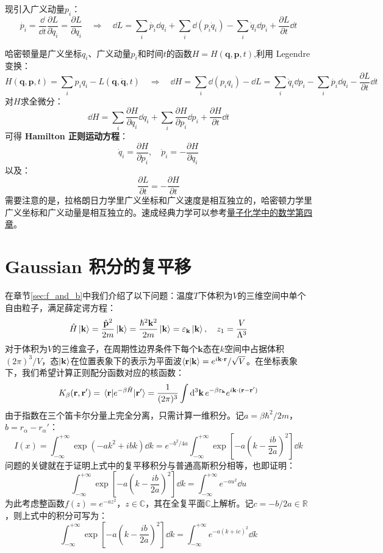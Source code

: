 现引入广义动量$p_i$：
\[\dot{p_i}=\frac{\dd}{\dd t}\frac{\partial L}{\partial \dot{q}_i}=\frac{\partial L}{\partial q_i} \quad \Rightarrow \quad \dd{L}=\sum_i\dot{p_i}\dd{q_i}+\sum_i\dd\left(p_i\dot{q}_i\right)-\sum_i\dot{q}_i\dd{p_i}+\frac{\partial L}{\partial t}\dd{t}\]

哈密顿量是广义坐标$q_i$、广义动量$p_i$和时间$t$的函数$H=H(\mathbf{q},\mathbf{p},t)$,利用 Legendre 变换：
\[H(\mathbf{q},\mathbf{p},t)=\sum_ip_iq_i-L(\mathbf{q},\dot{\mathbf{q}},t) \quad \Rightarrow \quad \dd{H}=\sum_i\dd\left(p_iq_i\right)-\dd{L}=\sum_i\dot{q}_i\dd{p_i}-\sum_i\dot{p_i}\dd{q_i}-\frac{\partial L}{\partial t}\dd{t}\]
对$H$求全微分：
\[\dd{H}=\sum_i\frac{\partial H}{\partial q_i}\dd{q_i}+\sum_i\frac{\partial H}{\partial p_i}\dd{p_i}+\frac{\partial H}{\partial t}\dd{t}\]
可得\textbf{ Hamilton 正则运动方程}：
\[\dot{q}_i=\frac{\partial H}{\partial p_i}, \quad \dot{p}_i=-\frac{\partial H}{\partial q_i}\]
以及：
\[\frac{\partial L}{\partial t}=-\frac{\partial H}{\partial t}\]
需要注意的是，拉格朗日力学里广义坐标和广义速度是相互独立的，哈密顿力学里广义坐标和广义动量是相互独立的。速成经典力学可以参考\href{https://github.com/Astolfo-Official/Baby-Math-on-Quantum-Chemistry/blob/main/%E3%80%8A%E9%87%8F%E5%AD%90%E5%8C%96%E5%AD%A6%E4%B8%AD%E7%9A%84%E6%95%B0%E5%AD%A6%E3%80%8B2.0.pdf}{量子化学中的数学第四章}。

\section{Gaussian 积分的复平移}\label{sec:gaussian}
在章节\ref{sec:f_and_b}中我们介绍了以下问题：温度$T$下体积为$V$的三维空间中单个自由粒子，满足薛定谔方程：
\[\hat{H}\ket{\mathbf{k}}=\frac{\hat{\mathbf{p}}^2}{2m}\ket{\mathbf{k}}=\frac{\hbar^2\mathbf{k}^2}{2m}\ket{\mathbf{k}}=\varepsilon_{\mathbf{k}}\ket{\mathbf{k}}, \quad z_1=\frac{V}{\Lambda^3}\]
对于体积为$V$的三维盒子，在周期性边界条件下每个$\mathbf{k}$态在$k$空间中占据体积$(2\pi)^3/V$，态$\ket{\mathbf{k}}$在位置表象下的表示为平面波$\bra{\mathbf{r}}\ket{\mathbf{k}}=e^{i\mathbf{k}\cdot\mathbf{r}}/\sqrt{V}$。在坐标表象下，我们希望计算正则配分函数对应的核函数：
\[K_{\beta}(\mathbf{r},\mathbf{r}')=\matrixel{\mathbf{r}}{e^{-\beta\hat{H}}}{\mathbf{r}'}=\frac{1}{(2\pi)^3}\int\dd[3]{\mathbf{k}} e^{-\beta\varepsilon_{\mathbf{k}}}e^{i\mathbf{k}\cdot(\mathbf{r}-\mathbf{r}')}\]
由于指数在三个笛卡尔分量上完全分离，只需计算一维积分。记$a=\beta\hbar^2/2m$，$b=r_{\alpha}-r_{\alpha}'$：
\[I(x)=\int_{-\infty}^{+\infty}\exp\left(-ak^2+ibk\right)\dd{k}=e^{-b^2/4a}\int_{-\infty}^{+\infty}\exp\left[-a\left(k-\frac{ib}{2a}\right)^2\right]\dd{k}\]
问题的关键就在于证明上式中的复平移积分与普通高斯积分相等，也即证明：
\[\boxed{\int_{-\infty}^{+\infty}\exp\left[-a\left(k-\frac{ib}{2a}\right)^2\right]\dd{k}=\int_{-\infty}^{+\infty}e^{-au^2}\dd{u}}\]
为此考虑整函数$f(z)=e^{-az^2}$，$z\in\mathbb{C}$，其在全复平面$\mathbb{C}$上解析。记$c=-b/2a\in\mathbb{R}$，则上式中的积分可写为：
\[\int_{-\infty}^{+\infty}\exp\left[-a\left(k-\frac{ib}{2a}\right)^2\right]\dd{k}=\int_{-\infty}^{+\infty}e^{-a(k+ic)^2}\dd{k}\]

